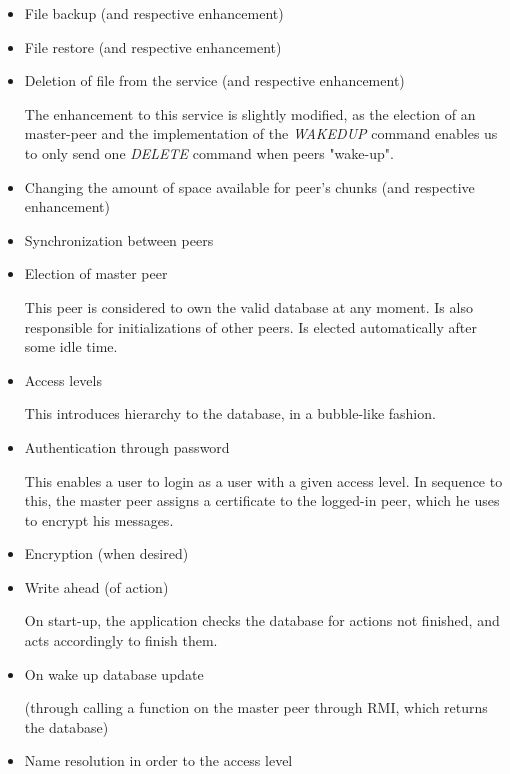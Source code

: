 \documentclass[a4paper]{article}
\begin{document}
\begin{itemize}

\item File backup (and respective enhancement)

\item File restore (and respective enhancement)

\item Deletion of file from the service (and respective enhancement)

The enhancement to this service is slightly modified, as the election of an master-peer and the implementation of the \textit{WAKEDUP} command enables us to only send one \textit{DELETE} command when peers "wake-up".

\item Changing the amount of space available for peer's chunks (and respective enhancement)

\item Synchronization between peers

\item Election of master peer

This peer is considered to own the valid database at any moment. Is also responsible for initializations of other peers. Is elected automatically after some idle time.

\item Access levels

This introduces hierarchy to the database, in a bubble-like fashion.

\item Authentication through password

This enables a user to login as a user with a given access level. In sequence to this, the master peer assigns a certificate to the logged-in peer, which he uses to encrypt his messages.

\item Encryption (when desired)

\item Write ahead (of action)

On start-up, the application checks the database for actions not finished, and acts accordingly to finish them.

\item On wake up database update

(through calling a function on the master peer through RMI, which returns the database)

\item Name resolution in order to the access level

\end{itemize}
\end{document}
